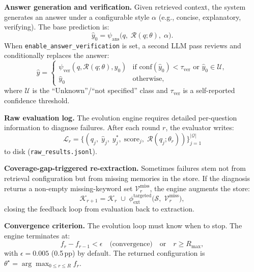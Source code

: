 \noindent \textbf{Answer generation and verification.} Given retrieved context, the system generates an answer under a configurable style $\alpha$ (e.g., concise, explanatory, verifying). The base prediction is:
\begin{equation}
    \hat{y}_0 = \psi_{\text{ans}}\!\bigl(q,\; \mathcal{R}(q;\theta),\; \alpha\bigr).
    \label{eq:answer}
\end{equation}
When \texttt{enable\_answer\_verification} is set, a second LLM pass reviews and conditionally replaces the answer:
\begin{equation}
    \hat{y} = \begin{cases}
        \psi_{\text{ver}}(q, \mathcal{R}(q;\theta), \hat{y}_0) & \text{if } \mathrm{conf}(\hat{y}_0) < \tau_{\text{ver}} \text{ or } \hat{y}_0 \in \mathcal{U}, \\
        \hat{y}_0 & \text{otherwise},
    \end{cases}
    \label{eq:verify}
\end{equation}
where $\mathcal{U}$ is the ``Unknown''/``not specified'' class and $\tau_{\text{ver}}$ is a self-reported confidence threshold.

\noindent \textbf{Raw evaluation log.} The evolution engine requires detailed per-question information to diagnose failures. After each round $r$, the evaluator writes:
\begin{equation}
    \mathcal{L}_r = \bigl\{(q_j,\; \hat{y}_j,\; y^*_j,\; \mathrm{score}_j,\; \mathcal{R}(q_j;\theta_r))\bigr\}_{j=1}^{|\mathcal{Q}|}
    \label{eq:raw_log}
\end{equation}
to disk (\texttt{raw\_results.jsonl}).

\noindent \textbf{Coverage-gap-triggered re-extraction.} Sometimes failures stem not from retrieval configuration but from missing memories in the store. If the diagnosis returns a non-empty missing-keyword set $\mathcal{V}^{\text{miss}}_r$, the engine augments the store:
\begin{equation}
    \mathcal{K}_{r+1} = \mathcal{K}_r \;\cup\; \phi_{\text{ext}}^{\text{targeted}}\!\bigl(\mathcal{S},\; \mathcal{V}^{\text{miss}}_r\bigr),
    \label{eq:gap_extract}
\end{equation}
closing the feedback loop from evaluation back to extraction.

\noindent \textbf{Convergence criterion.} The evolution loop must know when to stop. The engine terminates at:
\begin{equation}
    f_r - f_{r-1} < \epsilon \quad \text{(convergence)}\quad\text{or}\quad r \geq R_{\max},
    \label{eq:convergence}
\end{equation}
with $\epsilon = 0.005$ (0.5\,pp) by default. The returned configuration is $\theta^\star = \arg\max_{0 \leq r \leq R} f_r$.


